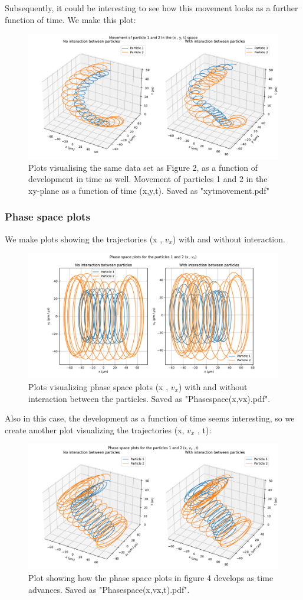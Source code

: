 \documentclass[english,notitlepage,reprint,nofootinbib,twocolumn]{article}
\begin{document}
Subsequently, it could be interesting to see how this movement looks as a further function of time. We make this plot: 
\begin{figure}[H]
    \centering
    \includegraphics[width = .45\textwidth]{xyt_movement.pdf} 
    \caption{Plots visualising the same data set as Figure 2, as a function of development in time as well. Movement of particles 1 and 2 in the xy-plane as a function of time (x,y,t). Saved as "xyt\textunderscore movement.pdf"}
    \label{fig: ee251}
\end{figure} 

\subsubsection{Phase space plots}
We make plots showing the trajectories (x , $v_x$) with and without interaction.
\begin{figure}[H]
    \centering
    \includegraphics[width = .45\textwidth]{Phasespace_(x,v_x).pdf} 
    \caption{Plots visualizing phase space plots (x , $v_x$) with and without interaction between the particles. Saved as "Phasespace\textunderscore (x,v\textunderscore x).pdf".}
    \label{fig: ee251}
\end{figure} 
Also in this case, the development as a function of time seems interesting, so we create another plot visualizing the trajectories (x, $v_x$ , t): 
\begin{figure}[H]
    \centering
    \includegraphics[width = .45\textwidth]{Phasespace_(x,v_x,t).pdf} 
    \caption{Plot showing how the phase space plots in figure 4 develops as time advances. Saved as "Phasespace\textunderscore (x,v\textunderscore x,t).pdf".}
    \label{fig: ee251}
\end{figure} 
\end{document}
